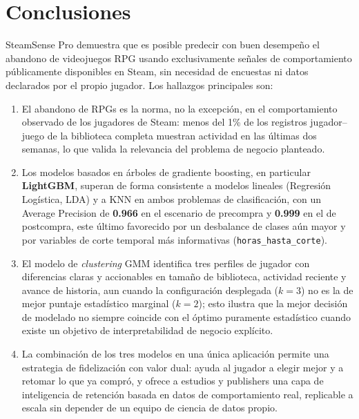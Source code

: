 \documentclass[11pt,letterpaper]{article}
\newcommand{\code}[1]{\texttt{\small #1}}
\begin{document}
\section{Conclusiones}
\label{sec:conclusiones}

SteamSense Pro demuestra que es posible predecir con buen desempeño el abandono de videojuegos RPG usando exclusivamente señales de comportamiento públicamente disponibles en Steam, sin necesidad de encuestas ni datos declarados por el propio jugador. Los hallazgos principales son:

\begin{enumerate}
  \item El abandono de RPGs es la norma, no la excepción, en el comportamiento observado de los jugadores de Steam: menos del 1\% de los registros jugador--juego de la biblioteca completa muestran actividad en las últimas dos semanas, lo que valida la relevancia del problema de negocio planteado.
  \item Los modelos basados en árboles de gradiente boosting, en particular \textbf{LightGBM}, superan de forma consistente a modelos lineales (Regresión Logística, LDA) y a KNN en ambos problemas de clasificación, con un Average Precision de \textbf{0.966} en el escenario de precompra y \textbf{0.999} en el de postcompra, este último favorecido por un desbalance de clases aún mayor y por variables de corte temporal más informativas (\code{horas\_hasta\_corte}).
  \item El modelo de \textit{clustering} GMM identifica tres perfiles de jugador con diferencias claras y accionables en tamaño de biblioteca, actividad reciente y avance de historia, aun cuando la configuración desplegada ($k=3$) no es la de mejor puntaje estadístico marginal ($k=2$); esto ilustra que la mejor decisión de modelado no siempre coincide con el óptimo puramente estadístico cuando existe un objetivo de interpretabilidad de negocio explícito.
  \item La combinación de los tres modelos en una única aplicación permite una estrategia de fidelización con valor dual: ayuda al jugador a elegir mejor y a retomar lo que ya compró, y ofrece a estudios y publishers una capa de inteligencia de retención basada en datos de comportamiento real, replicable a escala sin depender de un equipo de ciencia de datos propio.
\end{enumerate}
\end{document}
